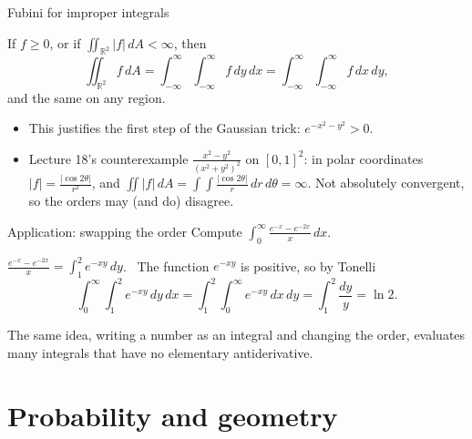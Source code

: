 \documentclass[10pt]{wosm-slides}
\newcommand{\R}{\mathbb{R}}
\newcommand{\dA}{\, dA}
\begin{document}
\begin{frame}{Fubini for improper integrals}
  \begin{theorem}
    If $f \ge 0$, or if $\iint_{\R^2} |f| \dA < \infty$, then
    \[ \iint_{\R^2} f \dA = \int_{-\infty}^\infty \int_{-\infty}^\infty f\, dy\, dx = \int_{-\infty}^\infty \int_{-\infty}^\infty f\, dx\, dy , \]
    and the same on any region.
  \end{theorem}
  \pause
  \begin{itemize}
    \item This justifies the first step of the Gaussian trick: $e^{-x^2 - y^2} > 0$.
    \item Lecture 18's counterexample $\frac{x^2 - y^2}{(x^2 + y^2)^2}$ on $[0, 1]^2$: in polar coordinates
      $|f| = \frac{|\cos 2\theta|}{r^2}$, and $\iint |f| \dA = \int\!\!\int \frac{|\cos 2\theta|}{r}\, dr\, d\theta = \infty$.
      Not absolutely convergent, so the orders may (and do) disagree.
  \end{itemize}
\end{frame}

\begin{frame}{Application: swapping the order}
  Compute $\displaystyle \int_0^\infty \frac{e^{-x} - e^{-2x}}{x}\, dx$.
  \pause
  \begin{example}
    $\displaystyle \frac{e^{-x} - e^{-2x}}{x} = \int_1^2 e^{-xy}\, dy$. \ The function $e^{-xy}$ is positive, so by Tonelli
    \[ \int_0^\infty \int_1^2 e^{-xy}\, dy\, dx = \int_1^2 \int_0^\infty e^{-xy}\, dx\, dy
       = \int_1^2 \frac{dy}{y} = \ln 2 . \]
  \end{example}
  \pause
  {\small The same idea, writing a number as an integral and changing the order, evaluates many
  integrals that have no elementary antiderivative.\par}
\end{frame}

\section{Probability and geometry}
\end{document}
